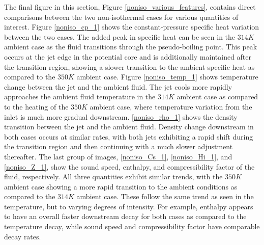 The final figure in this section, Figure \ref{noniso_various_features}, contains direct comparisons between the two non-isothermal cases for various quantities of interest. Figure \ref{noniso_cp_1} shows the constant-pressure specific heat variation between the two cases. The added peak in specific heat can be seen in the $314 K$ ambient case as the fluid transitions through the pseudo-boiling point. This peak occurs at the jet edge in the potential core and is additionally maintained after the transition region, showing a slower transition to the ambient specific heat as compared to the $350 K $ ambient case. Figure \ref{noniso_temp_1} shows temperature change between the jet and the ambient fluid. The jet cools more rapidly approaches the ambient fluid temperature in the $314 K$ ambient case as compared to the heating of the $350 K$ ambient case, where temperature variation from the inlet is much more gradual downstream. \ref{noniso_rho_1} shows the density transition between the jet and the ambient fluid. Density change downstream in both cases occurs at similar rates, with both jets exhibiting a rapid shift during the transition region and then continuing with a much slower adjustment thereafter. The last group of images, \ref{noniso_Cs_1}, \ref{noniso_Hi_1}, and \ref{noniso_Z_1}, show the sound speed, enthalpy, and compressibility factor of the fluid, respectively. All three quantities exhibit similar trends, with the $350 K$ ambient case showing a more rapid transition to the ambient conditions as compared to the $314 K$ ambient case. These follow the same trend as seen in the temperature, but to varying degrees of intensity. For example, enthalpy appears to have an overall faster downstream decay for both cases as compared to the temperature decay, while sound speed and compressibility factor have comparable decay rates. 

